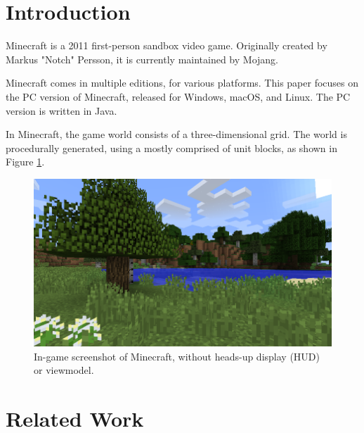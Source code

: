 \documentclass[]{article}
\begin{document}

\newpage
\tableofcontents
\newpage

\section{Introduction}
Minecraft is a 2011 first-person sandbox video game.
Originally created by Markus "Notch" Persson, it is currently maintained by Mojang.


Minecraft comes in multiple editions, for various platforms. This paper focuses on the PC version of Minecraft, released for Windows, macOS, and Linux.
The PC version is written in Java.

In Minecraft, the game world consists of a three-dimensional grid.
The world is procedurally generated, using a 
mostly comprised of unit blocks, as shown in Figure \ref{fig:ss-worldgen}.

\begin{figure}
  \includegraphics[width=\textwidth]{ss-worldgen.png}
  \centering
  \caption{In-game screenshot of Minecraft, without heads-up display (HUD) or viewmodel.}
  \label{fig:ss-worldgen}
\end{figure}

\section{Related Work}
\end{document}

